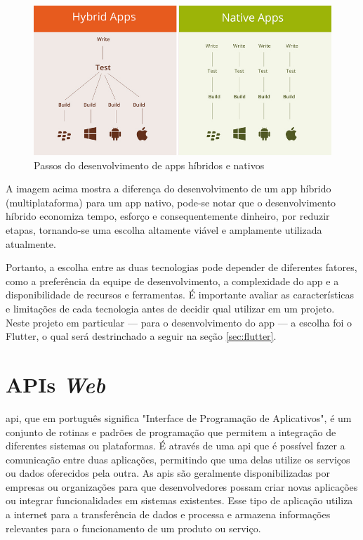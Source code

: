 \begin{figure}[H]
\centering
  \includegraphics[width=\columnwidth]{images/native-diff.png}
  \caption{Passos do desenvolvimento de \acp{app} híbridos e nativos}
  \label{fig:native_diff}
\end{figure}

A imagem acima mostra a diferença do desenvolvimento de um \ac{app} híbrido (multiplataforma) para um \ac{app} nativo, pode-se notar que o desenvolvimento híbrido economiza tempo, esforço e consequentemente dinheiro, por reduzir etapas, tornando-se uma escolha altamente viável e amplamente utilizada atualmente.

Portanto, a escolha entre as duas tecnologias pode depender de diferentes fatores, como a preferência da equipe de desenvolvimento, a complexidade do \ac{app} e a disponibilidade de recursos e ferramentas. É importante avaliar as características e limitações de cada tecnologia antes de decidir qual utilizar em um projeto. Neste projeto em particular — para o desenvolvimento do \ac{app} — a escolha foi o Flutter, o qual será destrinchado a seguir na seção \ref{sec:flutter}.

\section{APIs \textit{Web}}\label{sec:apis_web}
\ac{api}, que em português significa "Interface de Programação de Aplicativos", é um conjunto de rotinas e padrões de programação que permitem a integração de diferentes sistemas ou plataformas. É através de uma \ac{api} que é possível fazer a comunicação entre duas aplicações, permitindo que uma delas utilize os serviços ou dados oferecidos pela outra. As \acp{api} são geralmente disponibilizadas por empresas ou organizações para que desenvolvedores possam criar novas aplicações ou integrar funcionalidades em sistemas existentes. Esse tipo de aplicação utiliza a internet para a transferência
de dados e processa e armazena informações relevantes para o funcionamento de um produto
ou serviço.

